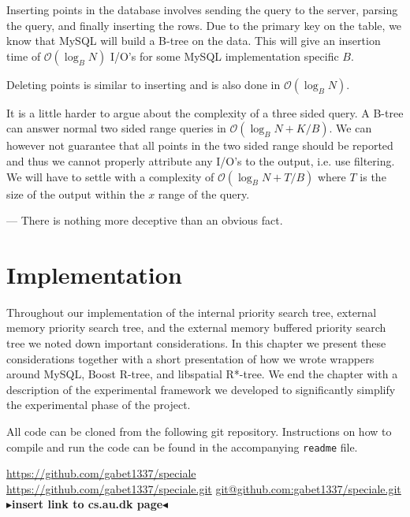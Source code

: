 \documentclass[twoside,11pt,openright]{report}
\newcommand{\todo}[1]{{\color[rgb]{.5,0,0}\textbf{$\blacktriangleright$#1$\blacktriangleleft$}}}
\begin{document}
Inserting points in the database involves sending the query to the server, parsing the query, and finally inserting the rows. Due to the primary key on the table, we know that MySQL will build a B-tree on the data. This will give an insertion time of $\mathcal{O}(\log_B N)$ I/O's for some MySQL implementation specific $B$.

Deleting points is similar to inserting and is also done in $\mathcal{O}(\log_B N)$.

It is a little harder to argue about the complexity of a three sided query. A B-tree can answer normal two sided range queries in $\mathcal{O}(\log_B N + K/B)$. We can however not guarantee that all points in the two sided range should be reported and thus we cannot properly attribute any I/O's to the output, i.e. use filtering. We will have to settle with a complexity of $\mathcal{O}(\log_B N + T/B)$ where $T$ is the size of the output within the $x$ range of the query.


\begin{savequote}[0.7\textwidth]
--- There is nothing more deceptive than an obvious fact.
\end{savequote}
\chapter{Implementation}
\label{chp:implementation}

Throughout our implementation of the internal priority search tree, external memory priority search tree, and the external memory buffered priority search tree we noted down important considerations.
In this chapter we present these considerations together with a short presentation of how we wrote wrappers around MySQL, Boost R-tree, and libspatial R*-tree. We end the chapter with a description of the experimental framework we developed to significantly simplify the experimental phase of the project.

All code can be cloned from the following git repository. Instructions on how to compile and run the code can be found in the accompanying \texttt{readme} file.

\begin{center}
\url{https://github.com/gabet1337/speciale}
\url{https://github.com/gabet1337/speciale.git}
\url{git@github.com:gabet1337/speciale.git}
\todo{insert link to cs.au.dk page}
\end{center}
\end{document}
